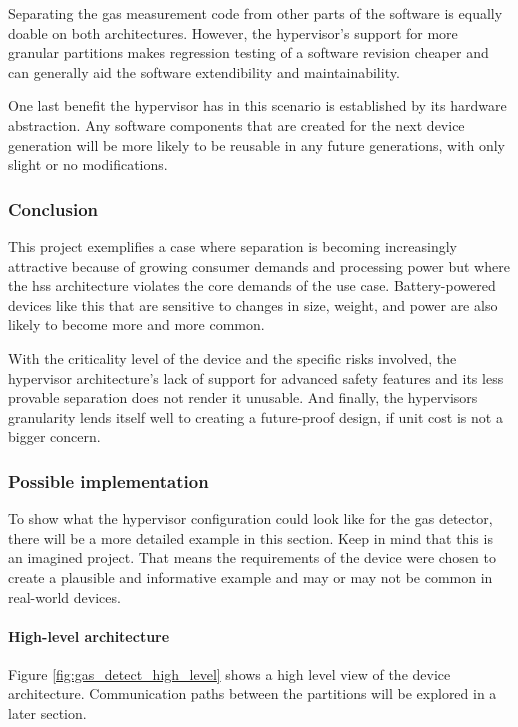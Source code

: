 Separating the gas measurement code from other parts of the software is equally doable on both architectures. However, the hypervisor's support for more granular partitions makes regression testing of a software revision cheaper and can generally aid the software extendibility and maintainability.

One last benefit the hypervisor has in this scenario is established by its hardware abstraction. Any software components that are created for the next device generation will be more likely to be reusable in any future generations, with only slight or no modifications.
\subsubsection{Conclusion}
This project exemplifies a case where separation is becoming increasingly attractive because of growing consumer demands and processing power but where the \acrshort{hss} architecture violates the core demands of the use case. Battery-powered devices like this that are sensitive to changes in size, weight, and power are also likely to become more and more common.

With the criticality level of the device and the specific risks involved, the hypervisor architecture's lack of support for advanced safety features and its less provable separation does not render it unusable. And finally, the hypervisors granularity lends itself well to creating a future-proof design, if unit cost is not a bigger concern. 
\subsubsection{Possible implementation}
To show what the hypervisor configuration could look like for the gas detector, there will be a more detailed example in this section. Keep in mind that this is an imagined project. That means the requirements of the device were chosen to create a plausible and informative example and may or may not be common in real-world devices.

\paragraph{ High-level architecture}
Figure \ref{fig:gas_detect_high_level} shows a high level view of the device architecture. Communication paths between the partitions will be explored in a later section.

